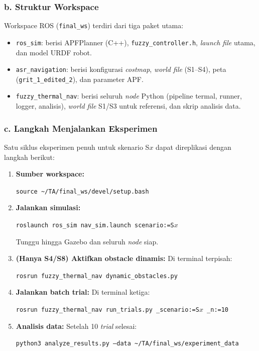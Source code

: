 \subsubsection*{b. Struktur Workspace}

Workspace ROS (\texttt{final\_ws}) terdiri dari tiga paket utama:
\begin{itemize}
    \item \texttt{ros\_sim}: berisi APFPlanner (C++), \texttt{fuzzy\_controller.h}, \textit{launch file} utama, dan model URDF robot.
    \item \texttt{asr\_navigation}: berisi konfigurasi \textit{costmap}, \textit{world file} (S1--S4), peta (\texttt{grit\_1\_edited\_2}), dan parameter APF.
    \item \texttt{fuzzy\_thermal\_nav}: berisi seluruh \textit{node} Python (pipeline termal, runner, logger, analisis), \textit{world file} S1/S3 untuk referensi, dan skrip analisis data.
\end{itemize}

\subsubsection*{c. Langkah Menjalankan Eksperimen}

Satu siklus eksperimen penuh untuk skenario S$x$ dapat direplikasi dengan langkah berikut:

\begin{enumerate}
    \item \textbf{Sumber workspace:}
    \begin{center}
    \texttt{source \textasciitilde/TA/final\_ws/devel/setup.bash}
    \end{center}

    \item \textbf{Jalankan simulasi:}
    \begin{center}
    \texttt{roslaunch ros\_sim nav\_sim.launch scenario:=S$x$}
    \end{center}
    Tunggu hingga Gazebo dan seluruh \textit{node} siap.

    \item \textbf{(Hanya S4/S8) Aktifkan obstacle dinamis:} Di terminal terpisah:
    \begin{center}
    \texttt{rosrun fuzzy\_thermal\_nav dynamic\_obstacles.py}
    \end{center}

    \item \textbf{Jalankan batch trial:} Di terminal ketiga:
    \begin{center}
    \texttt{rosrun fuzzy\_thermal\_nav run\_trials.py \_scenario:=S$x$ \_n:=10}
    \end{center}

    \item \textbf{Analisis data:} Setelah 10 \textit{trial} selesai:
    \begin{center}
    \texttt{python3 analyze\_results.py ---data \textasciitilde/TA/final\_ws/experiment\_data}
    \end{center}
\end{enumerate}